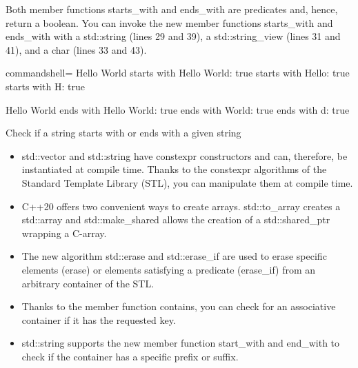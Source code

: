 Both member functions starts\_with and ends\_with are predicates and, hence, return a boolean. You can invoke the new member functions starts\_with and ends\_with with a std::string (lines 29 and 39), a std::string\_view (lines 31 and 41), and a char (lines 33 and 43).

\begin{tcblisting}{commandshell={}}
Hello World
            starts with Hello World: true
            starts with Hello: true
            starts with H: true
            
Hello World
            ends with Hello World: true
            ends with World: true
            ends with d: true
\end{tcblisting}

\begin{center}
Check if a string starts with or ends with a given string
\end{center}

\begin{tcolorbox}[colback=mygreen!5!white,colframe=mygreen!75!black,title={Distilled Information}]
	
\begin{itemize}
\item 
std::vector and std::string have constexpr constructors and can, therefore, be instantiated at compile time. Thanks to the constexpr algorithms of the Standard Template Library (STL), you can manipulate them at compile time.

\item 
C++20 offers two convenient ways to create arrays. std::to\_array creates a std::array and std::make\_shared allows the creation of a std::shared\_ptr wrapping a C-array.

\item 
The new algorithm std::erase and std::erase\_if are used to erase specific elements (erase) or elements satisfying a predicate (erase\_if) from an arbitrary container of the STL.

\item 
Thanks to the member function contains, you can check for an associative container if it has the requested key.

\item 
std::string supports the new member function start\_with and end\_with to check if the container has a specific prefix or suffix.
\end{itemize}
	
\end{tcolorbox}


\newpage


















